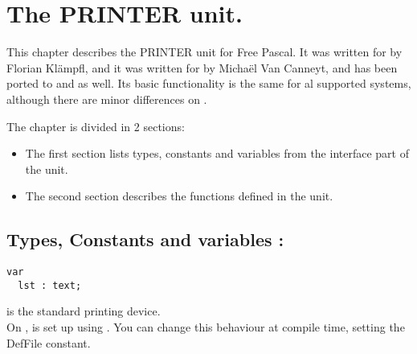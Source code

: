 %
%
%
%
%
\chapter{The PRINTER unit.}
\label{ch:printerunit}

This chapter describes the PRINTER unit for Free Pascal. It was written for
\dos by Florian Kl\"ampfl, and it was written for \linux by Micha\"el Van 
Canneyt, and has been ported to \windows and \ostwo as well. 
Its basic functionality is the same for al supported systems, although there 
are minor differences on \linux.

The chapter is divided in 2 sections:
\begin{itemize}
\item The first section lists types, constants and variables from the
interface part of the unit.
\item The second section describes the functions defined in the unit.
\end{itemize}
\section {Types, Constants and variables : }
\begin{verbatim}
var 
  lst : text;
\end{verbatim}
 is the standard printing device. \\ On \linux, 
 is set up using . 
You can change this behaviour at compile time, setting the DefFile constant.

